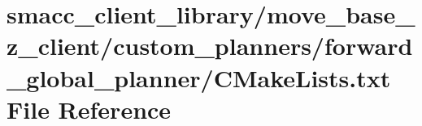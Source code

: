 \hypertarget{smacc__client__library_2move__base__z__client_2custom__planners_2forward__global__planner_2CMakeLists_8txt}{}\section{smacc\+\_\+client\+\_\+library/move\+\_\+base\+\_\+z\+\_\+client/custom\+\_\+planners/forward\+\_\+global\+\_\+planner/\+C\+Make\+Lists.txt File Reference}
\label{smacc__client__library_2move__base__z__client_2custom__planners_2forward__global__planner_2CMakeLists_8txt}
